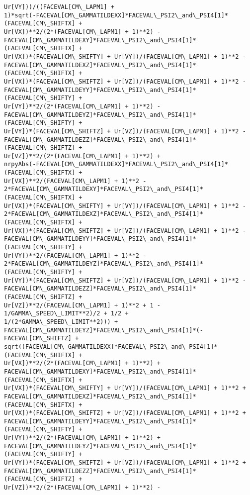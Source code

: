 \documentclass[landscape,letterpaper,10pt,english]{article}
\begin{document}
\begin{Verbatim}[commandchars=\\\{\}]
Ur[VY]))/((FACEVAL[CM\_LAPM1] +
1)*sqrt(-FACEVAL[CM\_GAMMATILDEXX]*FACEVAL\_PSI2\_and\_PSI4[1]*(FACEVAL[CM\_SHIFTX] +
Ur[VX])**2/(2*(FACEVAL[CM\_LAPM1] + 1)**2) -
FACEVAL[CM\_GAMMATILDEXY]*FACEVAL\_PSI2\_and\_PSI4[1]*(FACEVAL[CM\_SHIFTX] +
Ur[VX])*(FACEVAL[CM\_SHIFTY] + Ur[VY])/(FACEVAL[CM\_LAPM1] + 1)**2 -
FACEVAL[CM\_GAMMATILDEXZ]*FACEVAL\_PSI2\_and\_PSI4[1]*(FACEVAL[CM\_SHIFTX] +
Ur[VX])*(FACEVAL[CM\_SHIFTZ] + Ur[VZ])/(FACEVAL[CM\_LAPM1] + 1)**2 -
FACEVAL[CM\_GAMMATILDEYY]*FACEVAL\_PSI2\_and\_PSI4[1]*(FACEVAL[CM\_SHIFTY] +
Ur[VY])**2/(2*(FACEVAL[CM\_LAPM1] + 1)**2) -
FACEVAL[CM\_GAMMATILDEYZ]*FACEVAL\_PSI2\_and\_PSI4[1]*(FACEVAL[CM\_SHIFTY] +
Ur[VY])*(FACEVAL[CM\_SHIFTZ] + Ur[VZ])/(FACEVAL[CM\_LAPM1] + 1)**2 -
FACEVAL[CM\_GAMMATILDEZZ]*FACEVAL\_PSI2\_and\_PSI4[1]*(FACEVAL[CM\_SHIFTZ] +
Ur[VZ])**2/(2*(FACEVAL[CM\_LAPM1] + 1)**2) +
nrpyAbs(-FACEVAL[CM\_GAMMATILDEXX]*FACEVAL\_PSI2\_and\_PSI4[1]*(FACEVAL[CM\_SHIFTX] +
Ur[VX])**2/(FACEVAL[CM\_LAPM1] + 1)**2 -
2*FACEVAL[CM\_GAMMATILDEXY]*FACEVAL\_PSI2\_and\_PSI4[1]*(FACEVAL[CM\_SHIFTX] +
Ur[VX])*(FACEVAL[CM\_SHIFTY] + Ur[VY])/(FACEVAL[CM\_LAPM1] + 1)**2 -
2*FACEVAL[CM\_GAMMATILDEXZ]*FACEVAL\_PSI2\_and\_PSI4[1]*(FACEVAL[CM\_SHIFTX] +
Ur[VX])*(FACEVAL[CM\_SHIFTZ] + Ur[VZ])/(FACEVAL[CM\_LAPM1] + 1)**2 -
FACEVAL[CM\_GAMMATILDEYY]*FACEVAL\_PSI2\_and\_PSI4[1]*(FACEVAL[CM\_SHIFTY] +
Ur[VY])**2/(FACEVAL[CM\_LAPM1] + 1)**2 -
2*FACEVAL[CM\_GAMMATILDEYZ]*FACEVAL\_PSI2\_and\_PSI4[1]*(FACEVAL[CM\_SHIFTY] +
Ur[VY])*(FACEVAL[CM\_SHIFTZ] + Ur[VZ])/(FACEVAL[CM\_LAPM1] + 1)**2 -
FACEVAL[CM\_GAMMATILDEZZ]*FACEVAL\_PSI2\_and\_PSI4[1]*(FACEVAL[CM\_SHIFTZ] +
Ur[VZ])**2/(FACEVAL[CM\_LAPM1] + 1)**2 + 1 - 1/GAMMA\_SPEED\_LIMIT**2)/2 + 1/2 +
1/(2*GAMMA\_SPEED\_LIMIT**2))) +
FACEVAL[CM\_GAMMATILDEYZ]*FACEVAL\_PSI2\_and\_PSI4[1]*(-FACEVAL[CM\_SHIFTZ] +
sqrt((FACEVAL[CM\_GAMMATILDEXX]*FACEVAL\_PSI2\_and\_PSI4[1]*(FACEVAL[CM\_SHIFTX] +
Ur[VX])**2/(2*(FACEVAL[CM\_LAPM1] + 1)**2) +
FACEVAL[CM\_GAMMATILDEXY]*FACEVAL\_PSI2\_and\_PSI4[1]*(FACEVAL[CM\_SHIFTX] +
Ur[VX])*(FACEVAL[CM\_SHIFTY] + Ur[VY])/(FACEVAL[CM\_LAPM1] + 1)**2 +
FACEVAL[CM\_GAMMATILDEXZ]*FACEVAL\_PSI2\_and\_PSI4[1]*(FACEVAL[CM\_SHIFTX] +
Ur[VX])*(FACEVAL[CM\_SHIFTZ] + Ur[VZ])/(FACEVAL[CM\_LAPM1] + 1)**2 +
FACEVAL[CM\_GAMMATILDEYY]*FACEVAL\_PSI2\_and\_PSI4[1]*(FACEVAL[CM\_SHIFTY] +
Ur[VY])**2/(2*(FACEVAL[CM\_LAPM1] + 1)**2) +
FACEVAL[CM\_GAMMATILDEYZ]*FACEVAL\_PSI2\_and\_PSI4[1]*(FACEVAL[CM\_SHIFTY] +
Ur[VY])*(FACEVAL[CM\_SHIFTZ] + Ur[VZ])/(FACEVAL[CM\_LAPM1] + 1)**2 +
FACEVAL[CM\_GAMMATILDEZZ]*FACEVAL\_PSI2\_and\_PSI4[1]*(FACEVAL[CM\_SHIFTZ] +
Ur[VZ])**2/(2*(FACEVAL[CM\_LAPM1] + 1)**2) -

\end{Verbatim}
\end{document}
